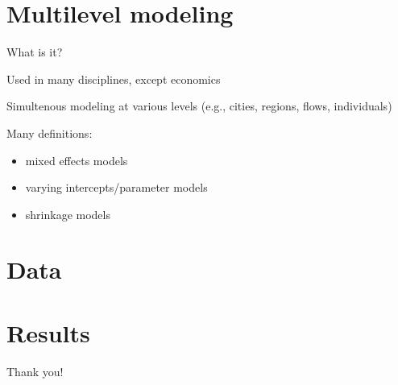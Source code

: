 \documentclass{beamer}
\begin{document}
  \section{Multilevel modeling}

  \begin{frame}{What is it?}

    Used in many disciplines, except economics

    Simultenous modeling at various levels (e.g., cities, regions, flows, individuals)

    Many definitions:
    \begin{itemize}
    \item mixed effects models
    \item varying intercepts/parameter models
    \item shrinkage models
          \end{itemize}
    
  \end{frame}

  \section{Data}


  \section{Results}

\begin{frame}[standout]
Thank you!
\end{frame}
\end{document}
